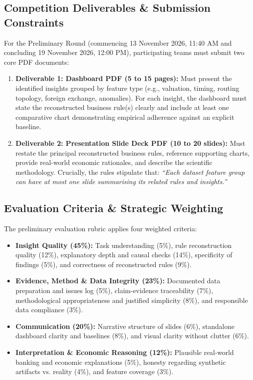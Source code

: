 \documentclass[11pt,a4paper]{article}
\begin{document}
\subsection{Competition Deliverables \& Submission Constraints}
For the Preliminary Round (commencing 13 November 2026, 11:40 AM and concluding 19 November 2026, 12:00 PM), participating teams must submit two core PDF documents:
\begin{enumerate}
    \item \textbf{Deliverable 1: Dashboard PDF (5 to 15 pages):} Must present the identified insights grouped by feature type (e.g., valuation, timing, routing topology, foreign exchange, anomalies). For each insight, the dashboard must state the reconstructed business rule(s) clearly and include at least one comparative chart demonstrating empirical adherence against an explicit baseline.
    \item \textbf{Deliverable 2: Presentation Slide Deck PDF (10 to 20 slides):} Must restate the principal reconstructed business rules, reference supporting charts, provide real-world economic rationales, and describe the scientific methodology. Crucially, the rules stipulate that: \textit{``Each dataset feature group can have at most one slide summarising its related rules and insights.''}
\end{enumerate}

\subsection{Evaluation Criteria \& Strategic Weighting}
The preliminary evaluation rubric applies four weighted criteria:
\begin{itemize}
    \item \textbf{Insight Quality (45\%):} Task understanding (5\%), rule reconstruction quality (12\%), explanatory depth and causal checks (14\%), specificity of findings (5\%), and correctness of reconstructed rules (9\%).
    \item \textbf{Evidence, Method \& Data Integrity (23\%):} Documented data preparation and issues log (5\%), claim-evidence traceability (7\%), methodological appropriateness and justified simplicity (8\%), and responsible data compliance (3\%).
    \item \textbf{Communication (20\%):} Narrative structure of slides (6\%), standalone dashboard clarity and baselines (8\%), and visual clarity without clutter (6\%).
    \item \textbf{Interpretation \& Economic Reasoning (12\%):} Plausible real-world banking and economic explanations (5\%), honesty regarding synthetic artifacts vs. reality (4\%), and feature coverage (3\%).
\end{itemize}
\end{document}
